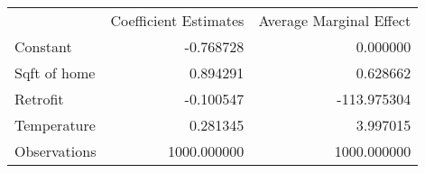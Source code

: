 \begin{tabular}{lrr}
 & Coefficient Estimates & Average Marginal Effect \\
Constant & -0.768728 & 0.000000 \\
Sqft of home & 0.894291 & 0.628662 \\
Retrofit & -0.100547 & -113.975304 \\
Temperature & 0.281345 & 3.997015 \\
Observations & 1000.000000 & 1000.000000 \\
\end{tabular}
